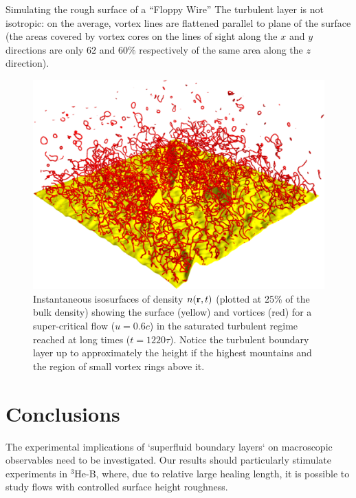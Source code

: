 \begin{chapter}{\label{cha:afm}Simulating the rough surface of a ``Floppy Wire''}
The turbulent
layer is not isotropic: on the average, vortex lines are 
flattened parallel to plane of the surface
(the areas covered by vortex cores on
the lines of sight along the $x$ and $y$ directions are only 62 and 60$\%$ 
respectively of the same area along the $z$ direction).

\begin{figure}
\centering
{}%
\includegraphics[width=0.5\linewidth]{./afm/fig2-2b}%
\caption{Instantaneous isosurfaces of density $n({\bf r},t)$ 
(plotted at 25\%  of the bulk density) showing the surface (yellow) and vortices (red) for a super-critical flow ($u=0.6 c$) in the saturated 
turbulent regime reached at long times ($t=1220 \tau$).  Notice the turbulent boundary layer up to
approximately the height if the highest mountains and the region
of small vortex rings above it.}
\label{fig2}
\end{figure} 

\section{Conclusions}
The experimental implications of `superfluid boundary layers` on macroscopic
observables need to be investigated.  Our results should
particularly stimulate experiments in $^3$He-B, where, due to relative
large healing length, it is possible to study flows with controlled 
surface height roughness. 

\end{chapter}


